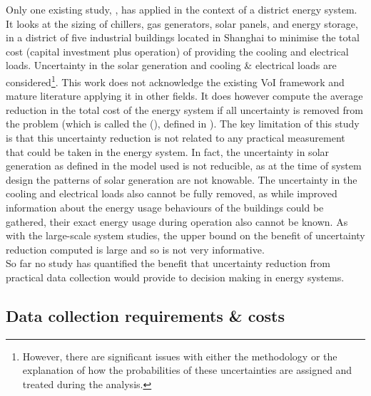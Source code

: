 Only one existing study, , has applied  in the context of a district energy system. It looks at the sizing of chillers, gas generators, solar panels, and energy storage, in a district of five industrial buildings located in Shanghai to minimise the total cost (capital investment plus operation) of providing the cooling and electrical loads. Uncertainty in the solar generation and cooling \& electrical loads are considered\footnote{However, there are significant issues with either the methodology or the explanation of how the probabilities of these uncertainties are assigned and treated during the analysis.}. This work does not acknowledge the existing VoI framework and mature literature applying it in other fields. It does however compute the average reduction in the total cost of the energy system if all uncertainty is removed from the problem (which is called the  (), defined in ). The key limitation of this study is that this uncertainty reduction is not related to any practical measurement that could be taken in the energy system. In fact, the uncertainty in solar generation as defined in the model used is not reducible, as at the time of system design the patterns of solar generation are not knowable. The uncertainty in the cooling and electrical loads also cannot be fully removed, as while improved information about the energy usage behaviours of the buildings could be gathered, their exact energy usage during operation also cannot be known. As with the large-scale system studies, the upper bound on the benefit of uncertainty reduction computed is large and so is not very informative.\\

So far no study has quantified the benefit that uncertainty reduction from practical data collection would provide to decision making in energy systems.


\newpage

\subsection{Data collection requirements \& costs} \label{sec:data-collection-lit}


